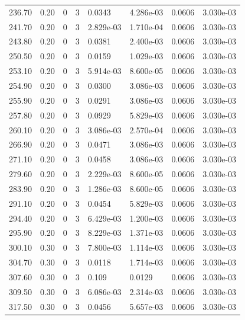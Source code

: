 \documentclass[preview]{standalone}
\begin{document}
{{{\begin{tabular}{L{1.2cm}C{1.2cm} C{0.3cm}C{0.5cm} C{1.4cm}C{1.4cm} C{1.4cm}C{1.4cm}}
  236.70  &  0.20  & 0     &  3 &  0.0343  & 4.286e-03  & 0.0606 &  3.030e-03   \\ 
  241.70  &  0.20  & 0     &  3 &  2.829e-03  & 1.710e-04  & 0.0606 &  3.030e-03   \\ 
  243.80  &  0.20  & 0     &  3 &  0.0381  & 2.400e-03  & 0.0606 &  3.030e-03   \\ 
  250.50  &  0.20  & 0     &  3 &  0.0159  & 1.029e-03  & 0.0606 &  3.030e-03   \\ 
  253.10  &  0.20  & 0     &  3 &  5.914e-03  & 8.600e-05  & 0.0606 &  3.030e-03   \\ 
  254.90  &  0.20  & 0     &  3 &  0.0300  & 3.086e-03  & 0.0606 &  3.030e-03   \\ 
  255.90  &  0.20  & 0     &  3 &  0.0291  & 3.086e-03  & 0.0606 &  3.030e-03   \\ 
  257.80  &  0.20  & 0     &  3 &  0.0929  & 5.829e-03  & 0.0606 &  3.030e-03   \\ 
  260.10  &  0.20  & 0     &  3 &  3.086e-03  & 2.570e-04  & 0.0606 &  3.030e-03   \\ 
  266.90  &  0.20  & 0     &  3 &  0.0471  & 3.086e-03  & 0.0606 &  3.030e-03   \\ 
  271.10  &  0.20  & 0     &  3 &  0.0458  & 3.086e-03  & 0.0606 &  3.030e-03   \\ 
  279.60  &  0.20  & 0     &  3 &  2.229e-03  & 8.600e-05  & 0.0606 &  3.030e-03   \\ 
  283.90  &  0.20  & 0     &  3 &  1.286e-03  & 8.600e-05  & 0.0606 &  3.030e-03   \\ 
  291.10  &  0.20  & 0     &  3 &  0.0454  & 5.829e-03  & 0.0606 &  3.030e-03   \\ 
  294.40  &  0.20  & 0     &  3 &  6.429e-03  & 1.200e-03  & 0.0606 &  3.030e-03   \\ 
  295.90  &  0.20  & 0     &  3 &  8.229e-03  & 1.371e-03  & 0.0606 &  3.030e-03   \\ 
  300.10  &  0.30  & 0     &  3 &  7.800e-03  & 1.114e-03  & 0.0606 &  3.030e-03   \\ 
  304.70  &  0.30  & 0     &  3 &  0.0118  & 1.714e-03  & 0.0606 &  3.030e-03   \\ 
  307.60  &  0.30  & 0     &  3 &  0.109  & 0.0129  & 0.0606 &  3.030e-03   \\ 
  309.50  &  0.30  & 0     &  3 &  6.086e-03  & 2.314e-03  & 0.0606 &  3.030e-03   \\ 
  317.50  &  0.30  & 0     &  3 &  0.0456  & 5.657e-03  & 0.0606 &  3.030e-03   \\ 

\end{tabular}}}}
\end{document}
